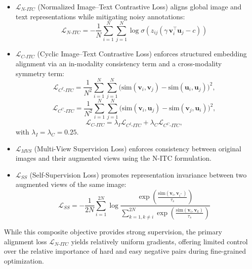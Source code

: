 \documentclass[conference]{IEEEtran}
\begin{document}
\begin{itemize}
\item $\mathcal{L}_{N\text{-}ITC}$ (Normalized Image--Text Contrastive Loss) aligns global image and text representations while mitigating noisy annotations:
\begin{equation}
\mathcal{L}_{N\text{-}ITC}= -\frac{1}{N}\sum_{i=1}^{N} \sum_{j=1}^{N}\log\sigma \!\left(z_{ij} \left( \gamma \, \mathbf{v}_i^\top \mathbf{u}_j - c \right)\right)
\end{equation}

\item $\mathcal{L}_{C\text{-}ITC}$ (Cyclic Image--Text Contrastive Loss) enforces structured embedding alignment via an in-modality consistency term and a cross-modality symmetry term:
\begin{equation}
\mathcal{L}_{C^I\text{-}ITC}=\frac{1}{N^2}\sum_{i=1}^{N} \sum_{j=1}^{N}\big(\text{sim}(\mathbf{v}_i, \mathbf{v}_j)-\text{sim}(\mathbf{u}_i, \mathbf{u}_j)\big)^2, 
\end{equation}
\begin{equation}
\mathcal{L}_{C^C\text{-}ITC}=\frac{1}{N^2}\sum_{i=1}^{N} \sum_{j=1}^{N}\big(\text{sim}(\mathbf{v}_i, \mathbf{u}_j)-\text{sim}(\mathbf{v}_j, \mathbf{u}_i)\big)^2,
\end{equation}
\begin{equation}
\mathcal{L}_{C\text{-}ITC} = \lambda_I \mathcal{L}_{C^I\text{-}ITC} + \lambda_C \mathcal{L}_{C^C\text{-}ITC},
\end{equation}
with $\lambda_I = \lambda_C = 0.25$.

\item $\mathcal{L}_{MVS}$ (Multi-View Supervision Loss) enforces consistency between original images and their augmented views using the N-ITC formulation.

\item $\mathcal{L}_{SS}$ (Self-Supervision Loss) promotes representation invariance between two augmented views of the same image:
\begin{equation}
\mathcal{L}_{SS}=-\frac{1}{2N}\sum_{i=1}^{2N}\log\frac{\exp \!\left(\frac{\text{sim}(\mathbf{v}_i, \mathbf{v}_{i^+})}{\tau_s}\right)
}{\sum_{k=1, k \neq i}^{2N}\exp \!\left(\frac{\text{sim}(\mathbf{v}_i, \mathbf{v}_k)}{\tau_s}\right)}
\end{equation}
\end{itemize}

While this composite objective provides strong supervision, the primary alignment loss $\mathcal{L}_{N\text{-}ITC}$ yields relatively uniform gradients, offering limited control over the relative importance of hard and easy negative pairs during fine-grained optimization.
\end{document}
